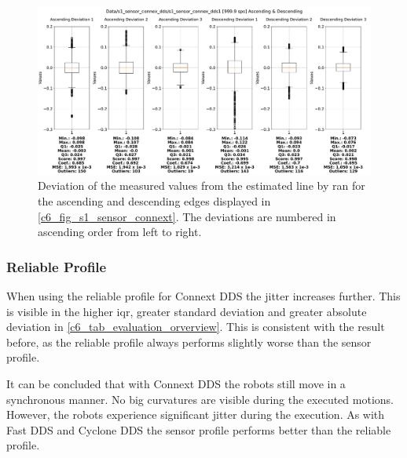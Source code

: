 \begin{figure}[htbp]
	\centering
	\includegraphics[width=1\textwidth]{Figures/c6/s1/s1_sensor_connext_dds_1_box_aio.pdf}
	\caption{Deviation of the measured values from the estimated line by \gls{ran} for the ascending and descending edges displayed in \autoref{c6_fig_s1_sensor_connext}. The deviations are numbered in ascending order from left to right.}
	\label{c6_fig_s1_connext_box_aio}
\end{figure}
\subsubsection{Reliable Profile}
When using the reliable profile for Connext DDS the jitter increases further. This is visible in the higher \gls{iqr}, greater standard deviation and greater absolute deviation in \autoref{c6_tab_evaluation_orverview}. This is consistent with the result before, as the reliable profile always performs slightly worse than the sensor profile.

It can be concluded that with Connext DDS the robots still move in a synchronous manner. No big curvatures are visible during the executed motions. However, the robots experience significant jitter during the execution. As with Fast DDS and Cyclone DDS the sensor profile performs better than the reliable profile.

